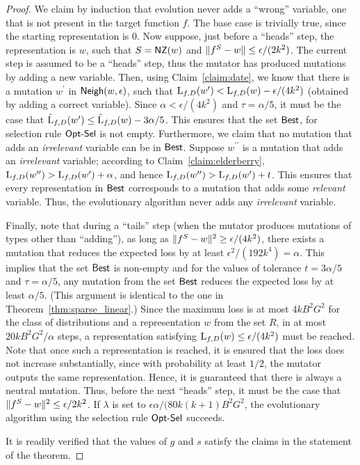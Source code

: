 \begin{proof}
We claim by induction that evolution never adds a ``wrong'' variable, \ie one
that is not present in the target function $f$. The base case is trivially true,
since the starting representation is $0$. Now suppose, just before a ``heads''
step, the representation is $w$, such that $S = \mathsf{NZ}(w)$ and $\Vert f^S - w \Vert
\leq \epsilon/(2k^2)$. The current step is assumed to be a ``heads'' step, thus
the mutator has produced mutations by adding a new variable. Then, using
Claim~\ref{claim:date}, we know that there is a mutation $w^\prime$ in
$\mathsf{Neigh}(w, \epsilon)$, such that $\mathrm{L}_{f, D}(w^\prime) < \mathrm{L}_{f, D}(w) -
\epsilon/(4k^2)$ (obtained by adding a correct variable). Since $\alpha <
\epsilon/(4k^2)$ and $\tau = \alpha/5$, it must be the case that
$\hat{\mathrm{L}}_{f, D}(w^\prime) \leq \hat{\mathrm{L}}_{f, D}(w) - 3 \alpha/5$. This
ensures that the set $\mathsf{Best}$, for selection rule $\mathsf{Opt\mbox{-}Sel}$ is not empty.
Furthermore, we claim that no mutation that adds an \emph{irrelevant} variable
can be in $\mathsf{Best}$. Suppose $w^{\prime\prime}$ is a mutation that adds an
\emph{irrelevant} variable; according to Claim~\ref{claim:elderberry},
$\mathrm{L}_{f, D}(w^{\prime\prime})> \mathrm{L}_{f, D}(w^\prime) + \alpha$, and hence
$\mathrm{L}_{f, D}(w^{\prime\prime}) > \mathrm{L}_{f, D}(w^\prime) + t$. This ensures
that every representation in $\mathsf{Best}$ corresponds to a mutation that adds some
\emph{relevant} variable. Thus, the evolutionary algorithm never adds any
\emph{irrelevant} variable.

Finally, note that during a ``tails'' step (when the mutator produces mutations of types
other than ``adding''), as long as $\Vert f^S - w \Vert^2 \geq \epsilon/(4k^2)$,
there exists a mutation that reduces the expected loss by at least
$\epsilon^2/(192k^4) = \alpha$. This implies that the set $\mathsf{Best}$ is non-empty
and for the values of tolerance $t = 3\alpha/5$ and $\tau = \alpha/5$, any
mutation from the set $\mathsf{Best}$ reduces the expected loss by at least $\alpha/5$.
(This argument is identical to the one in Theorem~\ref{thm:sparse_linear}.)
Since the maximum loss is at most $4kB^2G^2$ for the class of distributions and
a representation $w$ from the set $R$, in at most $20kB^2G^2/\alpha$ steps, a
representation satisfying $\mathrm{L}_{f, D}(w) \leq \epsilon/(4k^2)$ must be
reached. Note that once such a representation is reached, it is ensured that the
loss does not increase substantially, since with probability at least $1/2$, the
mutator outputs the same representation. Hence, it is guaranteed that there is
always a neutral mutation. Thus, before the next ``heads'' step, it must be the
case that $\Vert f^S - w \Vert^2 \leq \epsilon/2k^2$. If $\lambda$ is set to
$\epsilon\alpha/(80 k(k+1)B^2G^2$, the evolutionary algorithm using the
selection rule $\mathsf{Opt\mbox{-}Sel}$ succeeds. 

It is readily verified that the values of $g$ and $s$ satisfy the claims in the
statement of the theorem.
\end{proof}

